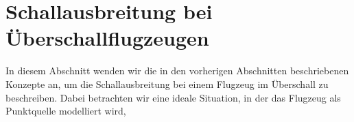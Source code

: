 %
%
%
%
\section{Schallausbreitung bei Überschallflugzeugen
\label{schall:section:teil3}}

In diesem Abschnitt wenden wir die in den vorherigen Abschnitten
beschriebenen Konzepte an, um die Schallausbreitung bei einem
Flugzeug im Überschall zu beschreiben.
Dabei betrachten wir eine ideale Situation, in der das Flugzeug als
Punktquelle modelliert wird,